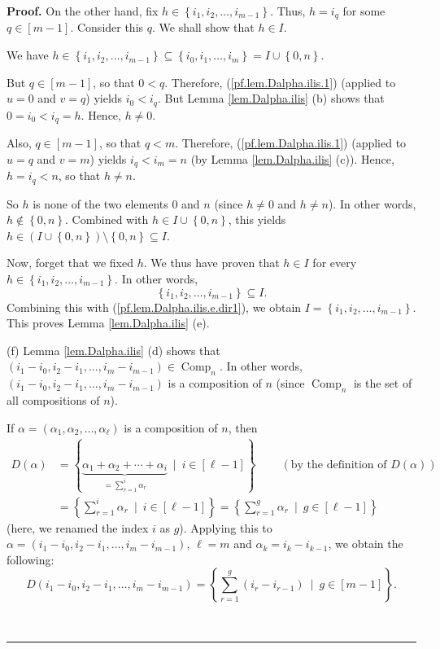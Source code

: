 \documentclass[numbers=enddot,12pt,final,onecolumn,notitlepage,abstracton]{scrartcl}
\theoremstyle{definition}
\newenvironment{proof}[1][Proof]{\noindent\textbf{#1.} }{\ \rule{0.5em}{0.5em}}
\let\sumnonlimits\sum
\renewcommand{\sum}{\sumnonlimits\limits}
\newenvironment{verlong}{}{}
\begin{document}
\begin{verlong}
\begin{footnotesize}
\begin{proof}
On the other hand, fix $h\in\left\{  i_{1},i_{2},\ldots,i_{m-1}\right\}  $.
Thus, $h=i_{q}$ for some $q\in\left[  m-1\right]  $. Consider this $q$. We
shall show that $h\in I$.

We have $h\in\left\{  i_{1},i_{2},\ldots,i_{m-1}\right\}  \subseteq\left\{
i_{0},i_{1},\ldots,i_{m}\right\}  =I\cup\left\{  0,n\right\}  $.

But $q\in\left[  m-1\right]  $, so that $0<q$. Therefore,
(\ref{pf.lem.Dalpha.ilis.1}) (applied to $u=0$ and $v=q$) yields $i_{0}<i_{q}%
$. But Lemma \ref{lem.Dalpha.ilis} (b) shows that $0=i_{0}<i_{q}=h$. Hence,
$h\neq0$.

Also, $q\in\left[  m-1\right]  $, so that $q<m$. Therefore,
(\ref{pf.lem.Dalpha.ilis.1}) (applied to $u=q$ and $v=m$) yields $i_{q}%
<i_{m}=n$ (by Lemma \ref{lem.Dalpha.ilis} (c)). Hence, $h=i_{q}<n$, so that
$h\neq n$.

So $h$ is none of the two elements $0$ and $n$ (since $h\neq0$ and $h\neq n$).
In other words, $h\notin\left\{  0,n\right\}  $. Combined with $h\in
I\cup\left\{  0,n\right\}  $, this yields $h\in\left(  I\cup\left\{
0,n\right\}  \right)  \setminus\left\{  0,n\right\}  \subseteq I$.

Now, forget that we fixed $h$. We thus have proven that $h\in I$ for every
$h\in\left\{  i_{1},i_{2},\ldots,i_{m-1}\right\}  $. In other words,
\[
\left\{  i_{1},i_{2},\ldots,i_{m-1}\right\}  \subseteq I.
\]
Combining this with (\ref{pf.lem.Dalpha.ilis.e.dir1}), we obtain $I=\left\{
i_{1},i_{2},\ldots,i_{m-1}\right\}  $. This proves Lemma \ref{lem.Dalpha.ilis} (e).

(f) Lemma \ref{lem.Dalpha.ilis} (d) shows that $\left(  i_{1}-i_{0}%
,i_{2}-i_{1},\ldots,i_{m}-i_{m-1}\right)  \in\operatorname*{Comp}%
\nolimits_{n}$. In other words, \newline
$\left(  i_{1}-i_{0},i_{2}-i_{1},\ldots
,i_{m}-i_{m-1}\right)  $ is a composition of $n$ (since $\operatorname*{Comp}%
\nolimits_{n}$ is the set of all compositions of $n$).

If $\alpha=\left(  \alpha_{1},\alpha_{2},\ldots,\alpha_{\ell}\right)  $ is a
composition of $n$, then%
\begin{align*}
D\left(  \alpha\right)   &  =\left\{  \underbrace{\alpha_{1}+\alpha_{2}%
+\cdots+\alpha_{i}}_{=\sum_{r=1}^{i}\alpha_{r}}\ \mid\ i\in\left[
\ell-1\right]  \right\}  \ \ \ \ \ \ \ \ \ \ \left(  \text{by the definition
of }D\left(  \alpha\right)  \right) \\
&  =\left\{  \sum_{r=1}^{i}\alpha_{r}\ \mid\ i\in\left[  \ell-1\right]
\right\}  =\left\{  \sum_{r=1}^{g}\alpha_{r}\ \mid\ g\in\left[  \ell-1\right]
\right\}
\end{align*}
(here, we renamed the index $i$ as $g$). Applying this to $\alpha=\left(
i_{1}-i_{0},i_{2}-i_{1},\ldots,i_{m}-i_{m-1}\right)  $, $\ell=m$ and
$\alpha_{k}=i_{k}-i_{k-1}$, we obtain the following:%
\begin{equation}
D\left(  i_{1}-i_{0},i_{2}-i_{1},\ldots,i_{m}-i_{m-1}\right)  =\left\{
\sum_{r=1}^{g}\left(  i_{r}-i_{r-1}\right)  \ \mid\ g\in\left[  m-1\right]
\right\}  . \label{pf.lem.Dalpha.ilis.f.1}%
\end{equation}



\end{proof}
\end{footnotesize}
\end{verlong}
\end{document}
